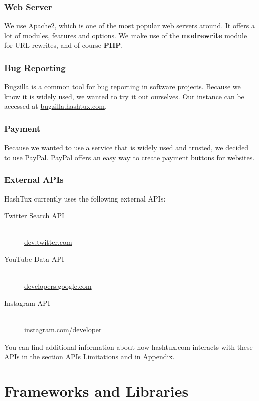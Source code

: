 \subsubsection{Web Server}
We use Apache2, which is one of the most popular web servers around. It offers a
lot of modules, features and options. We make use of the
\textbf{mod\textunderscore rewrite} module for URL rewrites, and of course
\textbf{PHP}.

\subsubsection{Bug Reporting}
Bugzilla is a common tool for bug reporting in software projects. Because we
know it is widely used, we wanted to try it out ourselves. Our instance can be
accessed at \href{http://bugzilla.hashtux.com}{bugzilla.hashtux.com}.

\subsubsection{Payment}
Because we wanted to use a service that is widely used and trusted, we decided
to use PayPal. PayPal offers an easy way to create payment buttons for websites.

\subsubsection{External APIs}
HashTux currently uses the following external APIs: \newline
\begin{description}
  \item[Twitter Search API] \hfill \\
  \href{https://dev.twitter.com/rest/public/search}{dev.twitter.com}
  \item[YouTube Data API] \hfill \\
  \href{https://developers.google.com/youtube/v3/}{developers.google.com}
  \item[Instagram API] \hfill \\
  \href{https://www.instagram.com/developer/}{instagram.com/developer}
\end{description}
You can find additional information about how hashtux.com interacts with these
APIs in the section \hyperlink{apilimits}{APIs Limitations} and in
\hyperlink{refapis}{Appendix}.

\section{Frameworks and Libraries}

